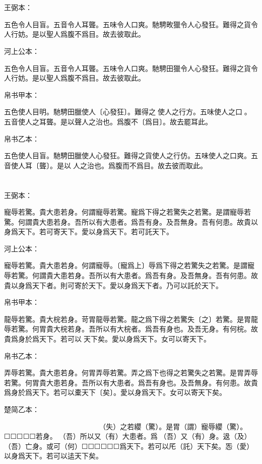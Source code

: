 \documentclass[a5paper]{ctexbook}
\begin{document}
    \chapter{}
    王弼本：

    五色令人目盲。五音令人耳聾。五味令人口爽。馳騁畋獵令人心發狂。難得之貨令人行妨。是以聖人爲腹不爲目。故去彼取此。

    河上公本：

    五色令人目盲。五音令人耳聾。五味令人口爽。馳騁田獵令人心發狂。難得之貨令人行妨。是以聖人爲腹不爲目。故去彼取此。

    帛书甲本：

    五色使人目明。馳騁田臘使人〔心發狂〕。難得之𧷴使人之行方。五味使人之口𠷹。五音使人之耳聾。是以聲人之治也。爲腹不〔爲目〕。故去罷耳此。

    帛书乙本：

    五色使人目盲。馳騁田臘使人心發狂。難得之貨使人之行仿。五味使人之口爽。五音使人耳〔聾〕。是以𦔻人之治也。爲腹而不爲目。故去彼而取此。

    \chapter{}
    王弼本：

    寵辱若驚。貴大患若身。何謂寵辱若驚。寵爲下得之若驚失之若驚。是謂寵辱若驚。何謂貴大患若身。吾所以有大患者。爲吾有身。及吾無身。吾有何患。故貴以身爲天下。若可寄天下。愛以身爲天下。若可託天下。

    河上公本：

    寵辱若驚。貴大患若身。何謂寵辱。〔寵爲上〕辱爲下得之若驚失之若驚。是謂寵辱若驚。何謂貴大患若身。吾所以有大患者。爲吾有身。及吾無身。吾有何患。故貴以身爲天下者。則可寄於天下。愛以身爲天下者。乃可以託於天下。

    帛书甲本：

    龍辱若驚。貴大梡若身。苛胃龍辱若驚。龍之爲下得之若驚失〔之〕若驚。是胃龍辱若驚。何胃貴大梡若身。吾所以有大梡者。爲吾有身也。及吾无身。有何梡。故貴爲身於爲天下。若可以𨒙天下矣。愛以身爲天下。女可以寄天下。

    帛书乙本：

    弄辱若驚。貴大患若身。何胃弄辱若驚。弄之爲下也得之若驚失之若驚。是胃弄辱若驚。何胃貴大患若身。吾所以有大患者。爲吾有身也。及吾無身。有何患。故貴爲身於爲天下。若可以橐天下〔矣〕。愛以身爲天下。女可以寄天下矣。

    楚简乙本：

    𢤲（寵）辱若纓（驚）。貴大患若身。可（何）胃（謂）𢤲（寵）辱。𢤲（寵）爲下也。得之若纓（驚）。󶴡（失）之若纓（驚）。是胃（謂）寵辱纓（驚）。☐☐☐☐☐若身。󼾲（吾）所以又（有）大患者。爲󼾲（吾）又（有）身。﨤（及）󼾲（吾）亡身。或可（何）☐☐☐☐☐☐爲天下。若可以厇（託）天下矣。㤅（愛）以身爲天下。若可以迲天下矣。
\end{document}
